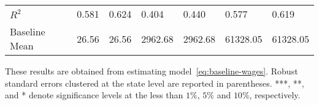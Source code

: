 \begin{table}[H]
\begin{tabular}{@{}lllllll@{}}
        $R^2$             & 0.581     & 0.624     & 0.404     & 0.440     & 0.577     & 0.619     \\
        Baseline Mean     & 26.56     & 26.56     & 2962.68   & 2962.68   & 61328.05  & 61328.05  \\ \bottomrule \bottomrule
    \end{tabular}
    \begin{minipage}{16.5cm}
        \vspace{0.05in}
        These results are obtained from estimating model~\ref{eq:baseline-wages}. Robust standard errors clustered at the state level are reported in parentheses. ***, **, and * denote significance levels at the less than $1\%$, $5\%$ and $10\%$, respectively.
    \end{minipage}
\end{table}
